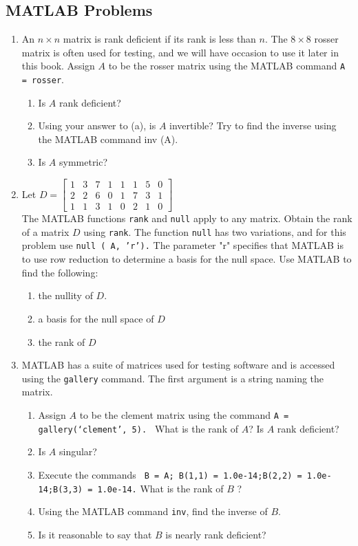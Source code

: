 \documentclass[../main.tex]{subfiles}
\begin{document}
\subsection{MATLAB Problems}
\begin{enumerate}[label=\textbf{3.\arabic*}, noitemsep]
	\addtocounter{enumi}{16}

\item An $n \times n$ matrix is rank deficient if its rank is less than $n$. The $8 \times 8$ rosser matrix is often used for testing, and we will have occasion to use it later in this book. Assign $A$ to be the rosser matrix using the MATLAB command \texttt{A = rosser}.
	\begin{enumerate}[label=\textbf{\alph*. }, noitemsep]
	\item Is $A$ rank deficient?
	\item Using your answer to (a), is $A$ invertible? Try to find the inverse using the MATLAB command inv (A).
	\item Is $A$ symmetric?
	\end{enumerate}


\item Let $D=\left[\begin{array}{llllllll}1 & 3 & 7 & 1 & 1 & 1 & 5 & 0 \\ 2 & 2 & 6 & 0 & 1 & 7 & 3 & 1 \\ 1 & 1 & 3 & 1 & 0 & 2 & 1 & 0\end{array}\right]$\\
The MATLAB functions \texttt{rank} and \texttt{null} apply to any matrix. Obtain the rank of a matrix $D$ using \texttt{rank}. The function \texttt{null} has two variations, and for this problem use \texttt{null ( A, 'r').}
The parameter "r" specifies that MATLAB is to use row reduction to determine a basis for the null space. Use MATLAB to find the following:
	\begin{enumerate}[label=\textbf{\alph*. }, noitemsep]
	\item the nullity of $D$.
	\item a basis for the null space of $D$
	\item the rank of $D$
	\end{enumerate}

\item MATLAB has a suite of matrices used for testing software and is accessed using the \texttt{gallery} command. The first argument is a string naming the matrix.
	\begin{enumerate}[label=\textbf{\alph*. }, noitemsep]
	\item  Assign $A$ to be the clement matrix using the command \texttt{A = gallery(‘clement’, 5). } What is the rank of $A $? Is $A$ rank deficient?
	\item Is $A$ singular?
	\item Execute the commands \texttt{ B = A;  B(1,1) = 1.0e-14;B(2,2) = 1.0e-14;B(3,3) = 1.0e-14.} What is the rank of $B$ ?
	\item Using the MATLAB command \texttt{inv}, find the inverse of $B$.
	\item Is it reasonable to say that $B$ is nearly rank deficient?
	\end{enumerate}


\end{enumerate}
\end{document}
